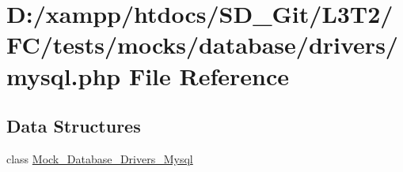 \hypertarget{drivers_2mysql_8php}{}\section{D\+:/xampp/htdocs/\+S\+D\+\_\+\+Git/\+L3\+T2/\+F\+C/tests/mocks/database/drivers/mysql.php File Reference}
\label{drivers_2mysql_8php}
\subsection*{Data Structures}
\begin{DoxyCompactItemize}
\item 
class \hyperlink{class_mock___database___drivers___mysql}{Mock\+\_\+\+Database\+\_\+\+Drivers\+\_\+\+Mysql}
\end{DoxyCompactItemize}
